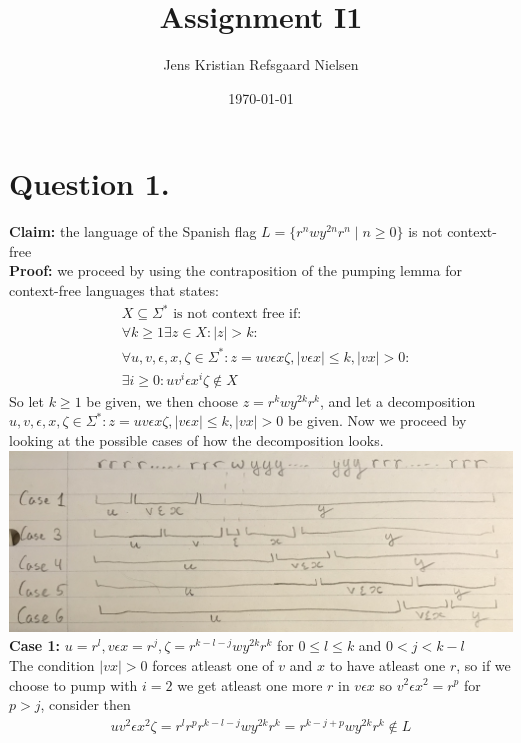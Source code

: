 \documentclass{article}
\theoremstyle{remark}
\numberwithin{equation}{section}
\begin{document}
	\author{Jens Kristian Refsgaard Nielsen}
	\title{Assignment I1}
	\date{\today}
	\maketitle
\section*{Question 1.}
\textbf{Claim: } the language of the Spanish flag $L = \{ r^n w y^{2n} r^n \mid n\geq 0 \}$ is not context-free\\
\textbf{Proof: } we proceed by using the contraposition of the pumping lemma for context-free languages that states:
\begin{align*}
	&X\subseteq \Sigma^* \text{ is not context free if:}\\
	&\forall k\geq 1 \exists z \in X : |z|>k:\\
	&\forall u,v,\epsilon,x,\zeta\in\Sigma^* : z=uv\epsilon x\zeta, |v\epsilon x|\leq k, |vx|>0:\\
	&\exists i\geq 0 : uv^i\epsilon x^i \zeta \notin X 
\end{align*}
So let $k\geq 1$ be given, we then choose $z=r^k w y^{2k} r^k$, and let a decomposition $u,v,\epsilon,x,\zeta\in\Sigma^* : z=uv\epsilon x\zeta, |v\epsilon x|\leq k, |vx|>0$ be given. Now we proceed by looking at the possible cases of how the decomposition looks.\\
\includegraphics[scale=0.09]{cases}\\
\textbf{Case 1:} $u = r^l, v\epsilon x = r^j, \zeta = r^{k-l-j}w y^{2k}r^k$ for $0\leq l\leq k$ and $0<j<k-l$\\
The condition $|vx|>0$ forces atleast one of $v$ and $x$ to have atleast one $r$, so if we choose to pump with $i = 2$ we get atleast one more $r$ in $v\epsilon x$ so $v^2\epsilon x^2 = r^p$ for $p>j$, consider then
\begin{align*}
	uv^2\epsilon x^2\zeta = r^l r^p r^{k-l-j}w y^{2k}r^k = r^{k-j+p}w y^{2k}r^k \notin L
\end{align*}
\end{document}
